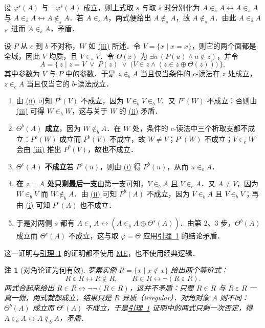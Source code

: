 \documentclass{article}
\makeatletter
\let\zhorighyperref\hyperref
\renewcommand{\hyperref}[2][]{\zhorighyperref[#1]{\mbox{#2}}}
\newlength{\ccwd}
\renewcommand{\proofname}{证明}
\renewenvironment{proof}[1][\proofname]{\par\pushQED{\qed}\normalfont\topsep6bp\@plus2bp\@minus1bp\relax
  \trivlist\item[\hskip\labelsep\hskip2\ccwd\bfseries #1\hspace{\dimexpr1em-\labelsep\relax}]\ignorespaces}{\popQED\endtrivlist\@endpefalse}
\theoremstyle{zh}
\newtheorem*{remark*}{注}
\newcommand{\eps}{\varepsilon}
\newcommand{\os}{\bar s}
\newcommand{\ME}{\textup{ME}}
\makeatother
\begin{document}
\begin{proof}
设 $\varphi^s(A)$ 与 $\neg\varphi^{\os}(A)$ 成立，则上式取 $s$ 与取 $\os$ 时分别化为 $A \in_s A \leftrightarrow A \in_{\os} A$ 与 $A \in_{\os} A \leftrightarrow A \notin_s A$．若 $A \in_s A$，两式便给出 $A \notin_s A$，故 $A \notin_s A$．由此 $A \in_{\os} A$，进而 $A \in_s A$，矛盾．
\end{proof}

\begin{proof}[{\hyperref[thm:1]{定理~1}} 的证明]
设 $P$ 从 $c$ 到 $b$ 不对称，$W$ 如 \hyperref[cond:iii]{(iii)} 所述．令 $V = \{x \mid x = x\}$，则它的两个面都是全域，因此 $V$ 均质，且 $V \in_s V$．令 $\Theta(z)$ 为 $\exists u\,(P(u) \wedge u \notin z)$，并令
\[
  A = \{\, z \mid z = V \;\vee\; P(z) \;\vee\; \bigl(V \in z \wedge (z \in z \oplus \Theta(z))\bigr) \,\},
\]
其中参数为 $V$ 与 $P$ 中的参数．于是 $z \in_b A$ 当且仅当条件的 $c$-读法在 $z$ 处成立，$z \in_c A$ 当且仅当它的 $b$-读法成立．
\begin{enumerate}[label=\arabic*.]
\item 由 \hyperref[cond:ii]{(ii)} 可知 $P^b(V)$ 不成立，因为 $V \in_b V \in_b V$．又 $P^c(W)$ 不成立：否则由 \hyperref[cond:iii]{(iii)} 可得 $W \in_b W$，这与关于 $W$ 的 \hyperref[cond:ii]{(ii)} 矛盾．
\item \textbf{\boldmath $\Theta^b(A)$ 成立}，因为 $W \notin_b A$．在 $W$ 处，条件的 $c$-读法中三个析取支都不成立：$P^b(W)$ 成立而 $P^b(V)$ 不成立，故 $W \neq V$；$P^c(W)$ 不成立；$V \in_c W$ 会由 \hyperref[cond:iii]{(iii)} 推出 $P^b(V)$，故也不成立．
\item \textbf{\boldmath $\Theta^c(A)$ 不成立}\quad 若 $P^c(u)$，则由 \hyperref[cond:i]{(i)} 得 $P^b(u)$，从而 $u \in_c A$．
\item \textbf{\boldmath 在 $z = A$ 处只剩最后一支}\quad 由第一支可知，$V \in_b A$ 且 $V \in_c A$．又 $A \neq V$，因为 $W \in_b V$ 而 $W \notin_b A$．由 \hyperref[cond:ii]{(ii)} 可知 $P^b(A)$ 不成立，因为 $V \in_b A$ 且 $V \in_b V$；再由 \hyperref[cond:i]{(i)} 可知 $P^c(A)$ 也不成立．
\item 于是对两侧 $s$ 都有 $A \in_s A \leftrightarrow (A \in_{\os} A \oplus \Theta^{\os}(A))$．由第 2、3 步，$\Theta^b(A)$ 成立而 $\Theta^c(A)$ 不成立，这与取 $\varphi = \Theta$ 应用\hyperref[lem:1]{引理~1} 的结论矛盾．
\end{enumerate}
这一证明与\hyperref[lem:1]{引理~1} 的证明都不使用 \hyperref[ax:ME]{\ME}，也不使用经典逻辑．
\end{proof}

\begin{remark*}[对角论证为何有效]
罗素实例 $R = \{x \mid x \notin x\}$ 给出两个等价式：
\[
  R \mathrel{\eps} R \leftrightarrow R \notin R, \qquad R \in R \leftrightarrow \neg(R \mathrel{\eps} R).
\]
两式合起来给出 $R \in R \leftrightarrow \neg\neg(R \in R)$，这并不矛盾：只要 $R \in R$ 与 $R \mathrel{\eps} R$ 一真一假，两式就都成立，结果只是 $R$ 异质（irregular）．对角对象 $A$ 则不同：$\Theta^b(A)$ 成立而 $\Theta^c(A)$ 不成立，于是\hyperref[lem:1]{引理~1} 证明中的两式只剩一次否定，得 $A \in_b A \leftrightarrow A \notin_b A$，矛盾．
\end{remark*}
\end{document}

